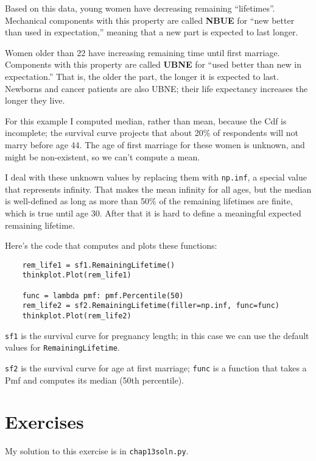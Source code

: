 \documentclass[12pt]{book}
\begin{document}
Based on this data, young women have decreasing remaining
``lifetimes''.  Mechanical components with this property are called {\bf NBUE}
for ``new better than used in expectation,'' meaning that a new part is
expected to last longer.

Women older than 22 have increasing remaining time until first
marriage.  Components with this property are called {\bf UBNE} for
``used better than new in expectation.''  That is, the older the part,
the longer it is expected to last.  Newborns and cancer patients are
also UBNE; their life expectancy increases the longer they live.

For this example I computed median, rather than mean, because the
Cdf is incomplete; the survival curve projects that about 20\%
of respondents will not marry before age 44.  The age of
first marriage for these women is unknown, and might be non-existent,
so we can't compute a mean.

I deal with these unknown values by replacing them with {\tt np.inf},
a special value that represents infinity.  That makes the mean
infinity for all ages, but the median is well-defined as long as
more than 50\% of the remaining lifetimes are finite, which is true
until age 30.  After that it is hard to define a meaningful
expected remaining lifetime.

Here's the code that computes and plots these functions:

\begin{verbatim}
    rem_life1 = sf1.RemainingLifetime()
    thinkplot.Plot(rem_life1)

    func = lambda pmf: pmf.Percentile(50)
    rem_life2 = sf2.RemainingLifetime(filler=np.inf, func=func)
    thinkplot.Plot(rem_life2)
\end{verbatim}

{\tt sf1} is the survival curve for pregnancy length;
in this case we can use the default values for {\tt RemainingLifetime}.

{\tt sf2} is the survival curve for age at first marriage;
{\tt func} is a function that takes a Pmf and computes its
median (50th percentile).


\section{Exercises}

My solution to this exercise is in \verb"chap13soln.py".
\end{document}
